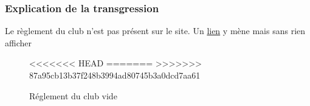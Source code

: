 \documentclass{article}[12pt]
\begin{document}
     \subsubsection*{Explication de la transgression}
     Le règlement du club n'est pas présent sur le site. Un \href{http://www.tennisclubdeparis.fr/reglement.html}{lien}  y mène mais sans rien afficher 
    
     \begin{figure}[H]
     	\centering
<<<<<<< HEAD
=======
>>>>>>> 87a95cb13b37f248b3994ad80745b3a0dcd7aa61
     	\caption{Réglement du club vide}
     \end{figure}
     \newpage
\end{document}
